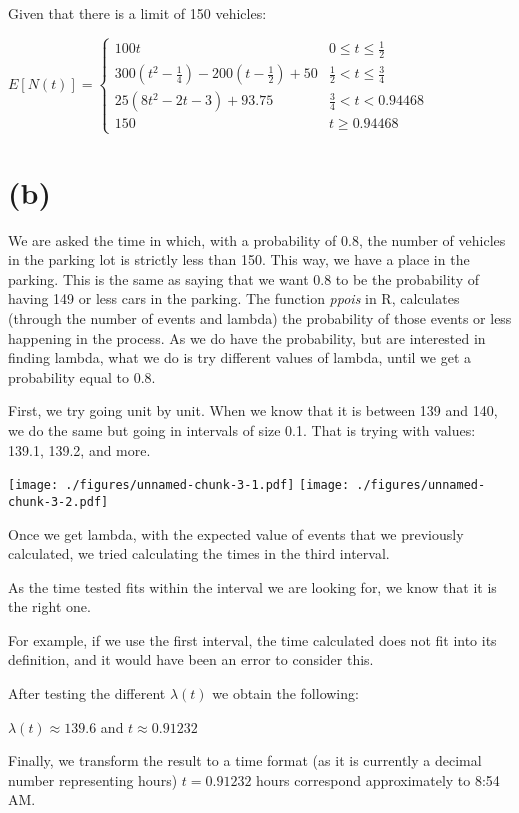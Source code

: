 \documentclass[]{article}
\begin{document}
Given that there is a limit of 150 vehicles:

\(E[N(t)] = \begin{cases} 100t & 0 \leq t \leq \frac{1}{2} \\ 300(t^2 - \frac{1}{4}) - 200(t - \frac{1}{2}) + 50 & \frac{1}{2} < t \leq \frac{3}{4} \\ 25(8t^2 - 2t - 3) + 93.75 & \frac{3}{4} < t < 0.94468 \\ 150 & t \geq 0.94468 \end{cases}\)

\hypertarget{b}{%
\section{(b)}\label{b}}

We are asked the time in which, with a probability of 0.8, the number of
vehicles in the parking lot is strictly less than 150. This way, we have
a place in the parking. This is the same as saying that we want 0.8 to
be the probability of having 149 or less cars in the parking. The
function \emph{ppois} in R, calculates (through the number of events and
lambda) the probability of those events or less happening in the
process. As we do have the probability, but are interested in finding
lambda, what we do is try different values of lambda, until we get a
probability equal to 0.8.

First, we try going unit by unit. When we know that it is between 139
and 140, we do the same but going in intervals of size 0.1. That is
trying with values: 139.1, 139.2, and more.

\texttt{[image: ./figures/unnamed-chunk-3-1.pdf]}
\texttt{[image: ./figures/unnamed-chunk-3-2.pdf]}

Once we get lambda, with the expected value of events that we previously
calculated, we tried calculating the times in the third interval.

As the time tested fits within the interval we are looking for, we know
that it is the right one.

For example, if we use the first interval, the time calculated does not
fit into its definition, and it would have been an error to consider
this.

After testing the different \(\lambda (t)\) we obtain the following:

\(\lambda (t) \approx 139.6\) and \(t \approx 0.91232\)

Finally, we transform the result to a time format (as it is currently a
decimal number representing hours) \(t = 0.91232\) hours correspond
approximately to 8:54 AM.
\end{document}
